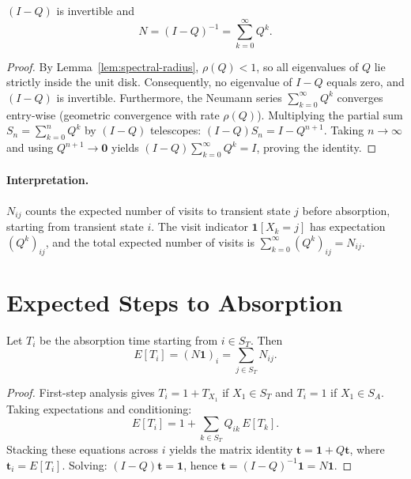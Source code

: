 \begin{theorem}
\label{thm:fundamental}
$(I - Q)$ is invertible and
\begin{equation}
\label{eq:G-fundamental}
N = (I - Q)^{-1} = \sum_{k=0}^{\infty} Q^k.
\end{equation}
\end{theorem}

\begin{proof}
By Lemma~\ref{lem:spectral-radius}, $\rho(Q) < 1$, so all eigenvalues of
$Q$ lie strictly inside the unit disk. Consequently, no eigenvalue of $I-Q$
equals zero, and $(I-Q)$ is invertible. Furthermore, the Neumann series
$\sum_{k=0}^{\infty} Q^k$ converges entry-wise (geometric convergence with
rate $\rho(Q)$). Multiplying the partial sum
$S_n = \sum_{k=0}^{n} Q^k$ by $(I - Q)$ telescopes:
$(I - Q) S_n = I - Q^{n+1}$. Taking $n \to \infty$ and using
$Q^{n+1} \to \mathbf{0}$ yields $(I - Q) \sum_{k=0}^{\infty} Q^k = I$,
proving the identity.
\end{proof}

\paragraph{Interpretation.} $N_{ij}$ counts the expected number of visits
to transient state $j$ before absorption, starting from transient state
$i$. The visit indicator $\mathbf{1}[X_k = j]$ has expectation
$(Q^k)_{ij}$, and the total expected number of visits is
$\sum_{k=0}^{\infty} (Q^k)_{ij} = N_{ij}$.


\section{Expected Steps to Absorption}
\label{app:G-expected}

\begin{theorem}
\label{thm:expected-time}
Let $T_i$ be the absorption time starting from $i \in S_T$. Then
\begin{equation}
\label{eq:G-expected}
E[T_i] = (N \mathbf{1})_i = \sum_{j \in S_T} N_{ij}.
\end{equation}
\end{theorem}

\begin{proof}
First-step analysis gives $T_i = 1 + T_{X_1}$ if $X_1 \in S_T$ and
$T_i = 1$ if $X_1 \in S_A$. Taking expectations and conditioning:
\begin{equation}
E[T_i] = 1 + \sum_{k \in S_T} Q_{ik} \, E[T_k].
\end{equation}
Stacking these equations across $i$ yields the matrix identity
$\mathbf{t} = \mathbf{1} + Q \mathbf{t}$, where
$\mathbf{t}_i = E[T_i]$. Solving: $(I - Q) \mathbf{t} = \mathbf{1}$, hence
$\mathbf{t} = (I - Q)^{-1} \mathbf{1} = N \mathbf{1}$.
\end{proof}


